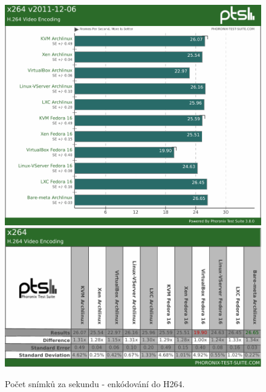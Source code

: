 \begin{figure}[h!]
  \centering
  \includegraphics[width=15cm]{obr/bench/x264-graph}
  \includegraphics[width=15cm]{obr/bench/x264-table}
  \caption{Počet snímků za sekundu - enkódování do H264.}
  \label{obr:bench:x264}
\end{figure}
